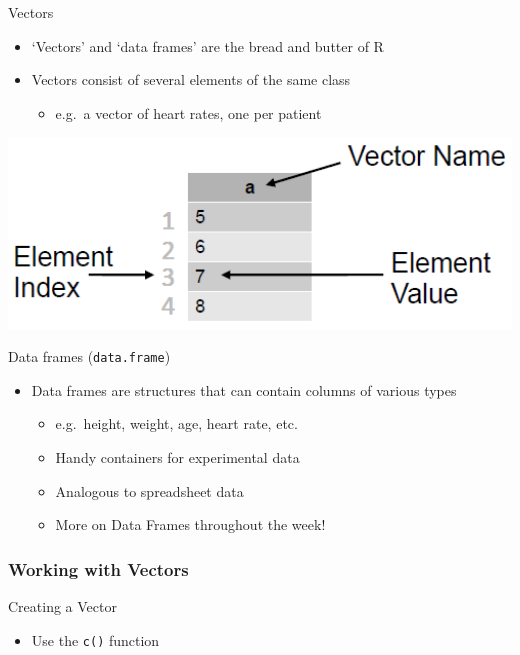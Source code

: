 \documentclass[]{book}
\providecommand{\tightlist}{%
  \setlength{\itemsep}{0pt}\setlength{\parskip}{0pt}}
\begin{document}
Vectors

\begin{itemize}
\tightlist
\item
  `Vectors' and `data frames' are the bread and butter of R
\item
  Vectors consist of several elements of the same class

  \begin{itemize}
  \tightlist
  \item
    e.g.~a vector of heart rates, one per patient
  \end{itemize}
\end{itemize}

\includegraphics[width=6.85in]{images/simple_vector}

Data frames (\texttt{data.frame})

\begin{itemize}
\tightlist
\item
  Data frames are structures that can contain columns of various types

  \begin{itemize}
  \tightlist
  \item
    e.g.~height, weight, age, heart rate, etc.
  \item
    Handy containers for experimental data
  \item
    Analogous to spreadsheet data
  \item
    More on Data Frames throughout the week!
  \end{itemize}
\end{itemize}

\hypertarget{working-with-vectors}{%
\subsubsection*{Working with Vectors}\label{working-with-vectors}}

Creating a Vector

\begin{itemize}
\tightlist
\item
  Use the \texttt{c()} function
\end{itemize}
\end{document}
